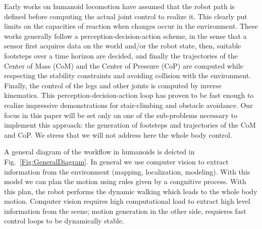 Early works on humanoid locomotion have assumed that the robot path is defined before computing the actual joint control to realize it. This clearly put limits on the capacities of reaction when changes occur in the environment. These works generally follow a perception-decision-action scheme, in the sense that a sensor first acquires data on the world and/or the robot state, then, suitable footsteps over a time horizon are decided, and finally the trajectories of the Center of Mass (CoM) and the Center of Pressure (CoP) are computed while respecting the stability constraints and avoiding collision with the environment. Finally, the control of the legs and other joints is computed by inverse kinematics. This perception-decision-action loop has proven to be fast enough  to realize impressive demonstrations for stair-climbing and obstacle avoidance. Our focus in this paper will be set only on one of the sub-problems necessary to implement this approach: the generation of footsteps and trajectories of the CoM and CoP. We stress that we will not address here the whole body control.


A general diagram of the workflow in humanoids is deícted in Fig.~\ref{Fig:GeneralDiagram}. In general we use computer vision to extract information from the environment (mapping, localization, modeling). With this model we can plan the motion using rules given by a congnitive process. With this plan, the robot performs the dynamic walking which leads to the whole body motion. Computer vision requires high computational load to extract high level information from the scene; motion generation in the other side, requieres fast control loops to be dynamically stable. 

